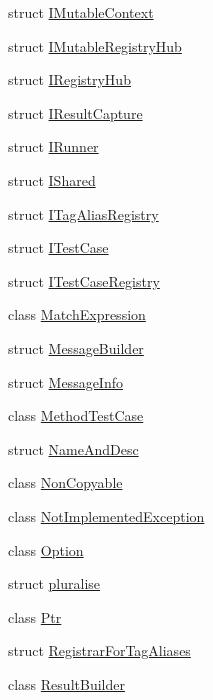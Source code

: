 \begin{DoxyCompactItemize}
\item 
struct \mbox{\hyperlink{struct_catch_1_1_i_mutable_context}{I\+Mutable\+Context}}
\item 
struct \mbox{\hyperlink{struct_catch_1_1_i_mutable_registry_hub}{I\+Mutable\+Registry\+Hub}}
\item 
struct \mbox{\hyperlink{struct_catch_1_1_i_registry_hub}{I\+Registry\+Hub}}
\item 
struct \mbox{\hyperlink{struct_catch_1_1_i_result_capture}{I\+Result\+Capture}}
\item 
struct \mbox{\hyperlink{struct_catch_1_1_i_runner}{I\+Runner}}
\item 
struct \mbox{\hyperlink{struct_catch_1_1_i_shared}{I\+Shared}}
\item 
struct \mbox{\hyperlink{struct_catch_1_1_i_tag_alias_registry}{I\+Tag\+Alias\+Registry}}
\item 
struct \mbox{\hyperlink{struct_catch_1_1_i_test_case}{I\+Test\+Case}}
\item 
struct \mbox{\hyperlink{struct_catch_1_1_i_test_case_registry}{I\+Test\+Case\+Registry}}
\item 
class \mbox{\hyperlink{class_catch_1_1_match_expression}{Match\+Expression}}
\item 
struct \mbox{\hyperlink{struct_catch_1_1_message_builder}{Message\+Builder}}
\item 
struct \mbox{\hyperlink{struct_catch_1_1_message_info}{Message\+Info}}
\item 
class \mbox{\hyperlink{class_catch_1_1_method_test_case}{Method\+Test\+Case}}
\item 
struct \mbox{\hyperlink{struct_catch_1_1_name_and_desc}{Name\+And\+Desc}}
\item 
class \mbox{\hyperlink{class_catch_1_1_non_copyable}{Non\+Copyable}}
\item 
class \mbox{\hyperlink{class_catch_1_1_not_implemented_exception}{Not\+Implemented\+Exception}}
\item 
class \mbox{\hyperlink{class_catch_1_1_option}{Option}}
\item 
struct \mbox{\hyperlink{struct_catch_1_1pluralise}{pluralise}}
\item 
class \mbox{\hyperlink{class_catch_1_1_ptr}{Ptr}}
\item 
struct \mbox{\hyperlink{struct_catch_1_1_registrar_for_tag_aliases}{Registrar\+For\+Tag\+Aliases}}
\item 
class \mbox{\hyperlink{class_catch_1_1_result_builder}{Result\+Builder}}
\item 

\end{DoxyCompactItemize}
